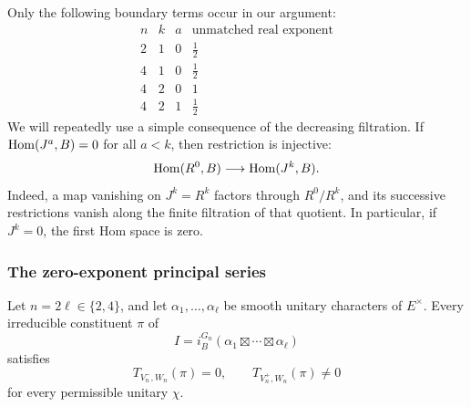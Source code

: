 Only the following boundary terms occur in our argument:
\[
\begin{array}{c|c|c|c}
 n&k&a&\text{unmatched real exponent}\\ \hline
 2&1&0&\tfrac12\\
 4&1&0&\tfrac12\\
 4&2&0&1\\
 4&2&1&\tfrac12
\end{array}
\]
We will repeatedly use a simple consequence of the decreasing
filtration.  If $\operatorname{Hom}(J^a,B)=0$ for all $a<k$, then restriction is
injective:
\begin{equation}
 \operatorname{Hom}(R^0,B)\longrightarrow\operatorname{Hom}(J^k,B).
 \label{blk:restriction-injective}
\end{equation}
Indeed, a map vanishing on $J^k=R^k$ factors through $R^0/R^k$, and its
successive restrictions vanish along the finite filtration of that
quotient.  In particular, if $J^k=0$, the first Hom space is zero.

\subsubsection{The zero-exponent principal series}

\begin{proposition}
\label{blk:principal-split}
\label{blk:zero}
Let $n=2\ell\in\{2,4\}$, and let $\alpha_1,\ldots,\alpha_\ell$ be
smooth unitary characters of $E^\times$.  Every irreducible constituent
$\pi$ of
\[
 I=i_B^{G_n}(\alpha_1\boxtimes\cdots\boxtimes\alpha_\ell)
\]
satisfies
\[
 T_{V_n^-,W_n}(\pi)=0,
 \qquad T_{V_n^+,W_n}(\pi)\ne0
\]
for every permissible unitary $\chi$.
\end{proposition}

